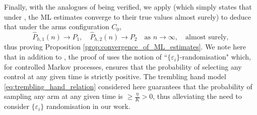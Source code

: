 Finally, with the analogues of \cite[Assumptions A1-A5 and A6.1]{borkar1982identification} being verified, we apply \cite[Theorem 4.3]{borkar1982identification} (which simply states that under \cite[Assumptions A1-A5 and A6.1]{borkar1982identification}, the ML estimates converge to their true values almost surely) to deduce that under the arms configuration $C_0$, $$\hat{P}_{h, 1}(n)\longrightarrow P_1,\quad \hat{P}_{h, 2}(n)\longrightarrow P_2 \quad\text{as }n\to\infty ,\quad\text{almost surely},$$ thus proving  Proposition \ref{prop:convergence_of_ML_estimates}. We note here that in addition to \cite[Assumptions A1-A5 and A6.1]{borkar1982identification}, the proof of \cite[Theorem 4.3]{borkar1982identification} uses the notion of ``$\{\varepsilon_i\}$-randomisation" which, for controlled Markov processes, ensures that the probability of selecting any control at any given time is strictly positive. The trembling hand model \eqref{eq:trembling_hand_relation} considered here guarantees that the probability of sampling any arm at any given time is $\geq \frac{\eta}{K}>0$, thus alleviating the need to consider $\{\varepsilon_i\}$ randomisation in our work.


